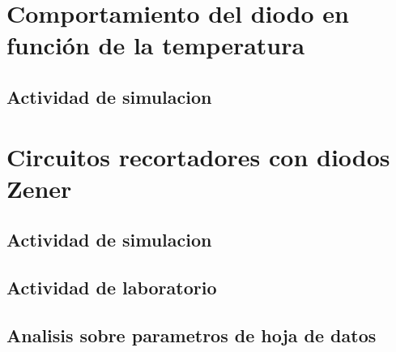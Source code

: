 \documentclass[chaptersright]{informeutn}
\begin{document}
  \part{Comportamiento del diodo en función de la temperatura}
    \chapter{Actividad de simulacion}
  \part{Circuitos recortadores con diodos Zener}
    \chapter{Actividad de simulacion}
    \chapter{Actividad de laboratorio}
    \chapter{Analisis sobre parametros de hoja de datos}
\end{document}
